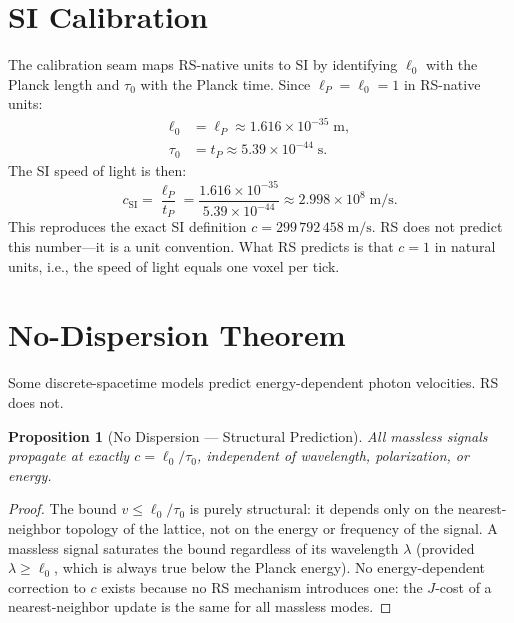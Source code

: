 \documentclass[12pt,a4paper]{article}
\newtheorem{proposition}[theorem]{Proposition}
\theoremstyle{definition}
\theoremstyle{remark}
\begin{document}
\section{SI Calibration}
\label{sec:si}

The calibration seam maps RS-native units to SI by identifying
$\ell_0$ with the Planck length and $\tau_0$ with the Planck time.
Since $\ell_P = \ell_0 = 1$ in RS-native units:
\begin{align}
  \ell_0 &= \ell_P \approx 1.616 \times 10^{-35}\;\mathrm{m}, \\
  \tau_0 &= t_P \approx 5.39 \times 10^{-44}\;\mathrm{s}.
\end{align}
The SI speed of light is then:
\begin{equation}
  c_{\mathrm{SI}} = \frac{\ell_P}{t_P}
  = \frac{1.616 \times 10^{-35}}{5.39 \times 10^{-44}}
  \approx 2.998 \times 10^8\;\mathrm{m/s}.
\end{equation}
This reproduces the exact SI definition
$c = 299\,792\,458\;\mathrm{m/s}$.  RS does not predict this
number---it is a unit convention.  What RS predicts is that $c = 1$
in natural units, i.e., the speed of light equals one voxel per tick.

\section{No-Dispersion Theorem}
\label{sec:dispersion}

Some discrete-spacetime models predict energy-dependent photon
velocities.  RS does not.

\begin{proposition}[No Dispersion --- Structural Prediction]
\label{thm:nodispersion}
All massless signals propagate at exactly $c = \ell_0/\tau_0$,
independent of wavelength, polarization, or energy.
\end{proposition}

\begin{proof}
The bound $v \leq \ell_0/\tau_0$ is purely structural: it
depends only on the nearest-neighbor topology of the lattice,
not on the energy or frequency of the signal.  A massless signal
saturates the bound regardless of its wavelength $\lambda$
(provided $\lambda \geq \ell_0$, which is always true below
the Planck energy).  No energy-dependent correction to $c$
exists because no RS mechanism introduces one: the $J$-cost
of a nearest-neighbor update is the same for all massless modes.
\end{proof}
\end{document}
